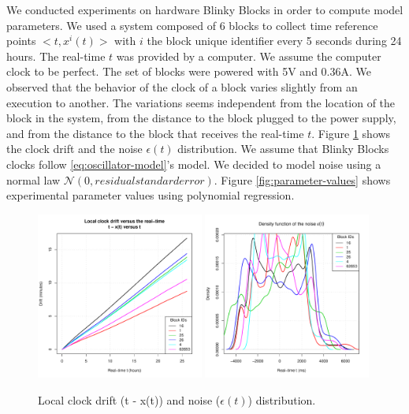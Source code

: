 \documentclass[11pt]{article}
\begin{document}
We conducted experiments on hardware Blinky Blocks in order to compute model parameters. We used a system composed of 6 blocks to collect time reference points $<t,x^i(t)>$ with $i$ the block unique identifier every 5 seconds during 24 hours. The real-time $t$ was provided by a computer. We assume the computer clock to be perfect. The set of blocks were powered with 5V and 0.36A. We observed that the behavior of the clock of a block varies slightly from an execution to another. The variations seems independent from the location of the block in the system, from the distance to the block plugged to the power supply, and from the distance to the block that receives the real-time $t$. Figure \ref{fig:drift-noise} shows the clock drift and the noise $\epsilon(t)$ distribution.  We assume that Blinky Blocks clocks follow \eqref{eq:oscillator-model}'s model. We decided to model noise using a normal law $\mathcal{N}(0,residual standard error)$. Figure \ref{fig:parameter-values} shows experimental parameter values using polynomial regression. 

\begin{figure}[h!]
\centering
\includegraphics[width=0.49\textwidth]{pictures/drift.pdf}
\includegraphics[width=0.49\textwidth]{pictures/noise.pdf}
\caption{Local clock drift (t - x(t)) and noise ($\epsilon(t)$) distribution.}
\label{fig:drift-noise}
\end{figure}
\end{document}
